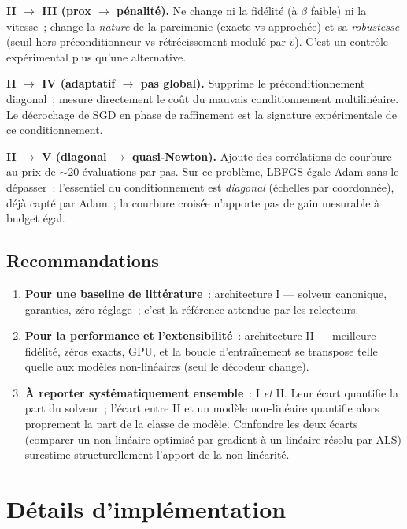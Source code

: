 \documentclass[11pt,a4paper]{article}
\begin{document}
\textbf{II $\to$ III (prox $\to$ pénalité).} Ne change ni la fidélité (à
$\beta$ faible) ni la vitesse~; change la \emph{nature} de la parcimonie
(exacte vs approchée) et sa \emph{robustesse} (seuil hors préconditionneur vs
rétrécissement modulé par $\hat{v}$). C'est un contrôle expérimental plus
qu'une alternative.

\textbf{II $\to$ IV (adaptatif $\to$ pas global).} Supprime le
préconditionnement diagonal~; mesure directement le coût du mauvais
conditionnement multilinéaire. Le décrochage de SGD en phase de raffinement
est la signature expérimentale de ce conditionnement.

\textbf{II $\to$ V (diagonal $\to$ quasi-Newton).} Ajoute des corrélations de
courbure au prix de $\sim$20 évaluations par pas. Sur ce problème, LBFGS
égale Adam sans le dépasser~: l'essentiel du conditionnement est
\emph{diagonal} (échelles par coordonnée), déjà capté par Adam~; la courbure
croisée n'apporte pas de gain mesurable à budget égal.

\subsection{Recommandations}

\begin{enumerate}
  \item \textbf{Pour une baseline de littérature}~: architecture I — solveur
  canonique, garanties, zéro réglage~; c'est la référence attendue par les
  relecteurs.
  \item \textbf{Pour la performance et l'extensibilité}~: architecture II —
  meilleure fidélité, zéros exacts, GPU, et la boucle d'entraînement se
  transpose telle quelle aux modèles non-linéaires (seul le décodeur change).
  \item \textbf{À reporter systématiquement ensemble}~: I \emph{et} II. Leur
  écart quantifie la part du solveur~; l'écart entre II et un modèle
  non-linéaire quantifie alors proprement la part de la classe de modèle.
  Confondre les deux écarts (comparer un non-linéaire optimisé par gradient à
  un linéaire résolu par ALS) surestime structurellement l'apport de la
  non-linéarité.
\end{enumerate}

\section{Détails d'implémentation}
\end{document}
